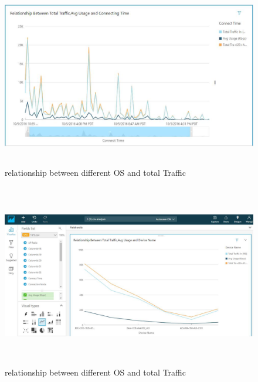  \begin{figure}[H]
 \includegraphics[width=17cm, height=8cm]{4.jpg}
 \centering
 \caption{\label{fig:3}relationship between different OS and total Traffic}
 \end{figure}
 
 \begin{figure}[H]
 \includegraphics[width=17cm, height=8cm]{5.jpg}
 \centering
 \caption{\label{fig:4}relationship between different OS and total Traffic}
 \end{figure}

 
 
	